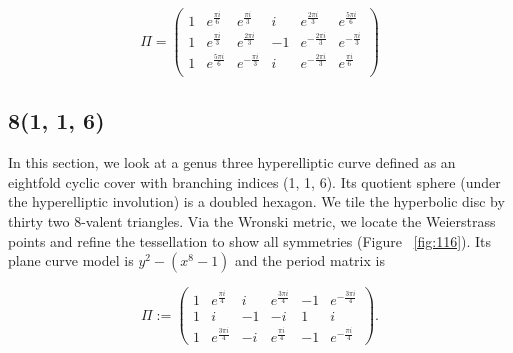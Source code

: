\documentclass[12pt,reqno]{amsart}
\theoremstyle{definition}
\theoremstyle{remark}
\begin{document}
$$\Pi = \begin{pmatrix} 1 & e^{\frac{\pi i}{6}} & e^{\frac{\pi i}{3}} & i & e^{\frac{2 \pi i}{3}} & e^{\frac{5 \pi i}{6}} \\
 1 & e^{\frac{\pi i}{3}} & e^{\frac{2 \pi i}{3}} & -1 & e^{-\frac{2 \pi i}{3}} & e^{-\frac{\pi i}{3}} \\
 1 & e^{\frac{5 \pi i}{6}} & e^{-\frac{\pi i}{3}} & i & e^{-\frac{2 \pi i}{3}} & e^{\frac{\pi i}{6}} \\
\end{pmatrix}$$


\subsection{8(1, 1, 6)}
In this section, we look at a genus three hyperelliptic curve defined as an eightfold cyclic cover with branching indices (1, 1, 6). Its quotient sphere (under the hyperelliptic involution) is a doubled hexagon. We tile the hyperbolic disc by thirty two 8-valent triangles. Via the Wronski metric, we locate the Weierstrass points and refine the tessellation to show all symmetries (Figure~ \cref{fig:116}). Its plane curve model is $y^2 - (x^8 - 1)$ and the period matrix is 

$$\Pi := \begin{pmatrix}
 1 & e^{\frac{\pi i}{4}} & i & e^{\frac{3 \pi i}{4}} & -1 & e^{-\frac{3 \pi i}{4}} \\
 1 & i & -1 & -i & 1 & i \\
 1 & e^{\frac{3 \pi i}{4}} & -i & e^{\frac{\pi i}{4}} & -1 & e^{-\frac{\pi i}{4}} \end{pmatrix}.$$ 
\end{document}

